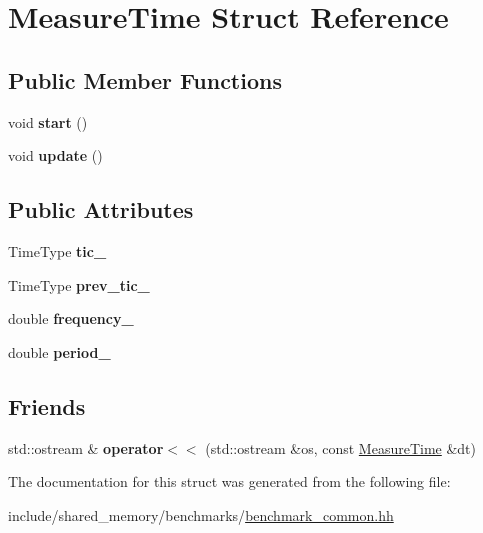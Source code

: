 \hypertarget{structMeasureTime}{}\section{Measure\+Time Struct Reference}
\label{structMeasureTime}
\subsection*{Public Member Functions}
\begin{DoxyCompactItemize}
\item 
void {\bfseries start} ()\hypertarget{structMeasureTime_a6ca73f3044c7d89271904c43e2f9dc2c}{}\label{structMeasureTime_a6ca73f3044c7d89271904c43e2f9dc2c}

\item 
void {\bfseries update} ()\hypertarget{structMeasureTime_a1714eb45e5ed00a6c90ed36f5d88166a}{}\label{structMeasureTime_a1714eb45e5ed00a6c90ed36f5d88166a}

\end{DoxyCompactItemize}
\subsection*{Public Attributes}
\begin{DoxyCompactItemize}
\item 
Time\+Type {\bfseries tic\+\_\+}\hypertarget{structMeasureTime_a1bfc128b5d3e0f76e99f809acc985ea2}{}\label{structMeasureTime_a1bfc128b5d3e0f76e99f809acc985ea2}

\item 
Time\+Type {\bfseries prev\+\_\+tic\+\_\+}\hypertarget{structMeasureTime_a7a84fdaf6c46c7de792aca6a13ad6382}{}\label{structMeasureTime_a7a84fdaf6c46c7de792aca6a13ad6382}

\item 
double {\bfseries frequency\+\_\+}\hypertarget{structMeasureTime_a5b76f0c97263601aa07d05272e264735}{}\label{structMeasureTime_a5b76f0c97263601aa07d05272e264735}

\item 
double {\bfseries period\+\_\+}\hypertarget{structMeasureTime_a82f4db9bb7b6ae41a8a02d3c25a9a0ff}{}\label{structMeasureTime_a82f4db9bb7b6ae41a8a02d3c25a9a0ff}

\end{DoxyCompactItemize}
\subsection*{Friends}
\begin{DoxyCompactItemize}
\item 
std\+::ostream \& {\bfseries operator$<$$<$} (std\+::ostream \&os, const \hyperlink{structMeasureTime}{Measure\+Time} \&dt)\hypertarget{structMeasureTime_a610d259dacbe716701935d50ecba7780}{}\label{structMeasureTime_a610d259dacbe716701935d50ecba7780}

\end{DoxyCompactItemize}


The documentation for this struct was generated from the following file\+:\begin{DoxyCompactItemize}
\item 
include/shared\+\_\+memory/benchmarks/\hyperlink{benchmark__common_8hh}{benchmark\+\_\+common.\+hh}\end{DoxyCompactItemize}
